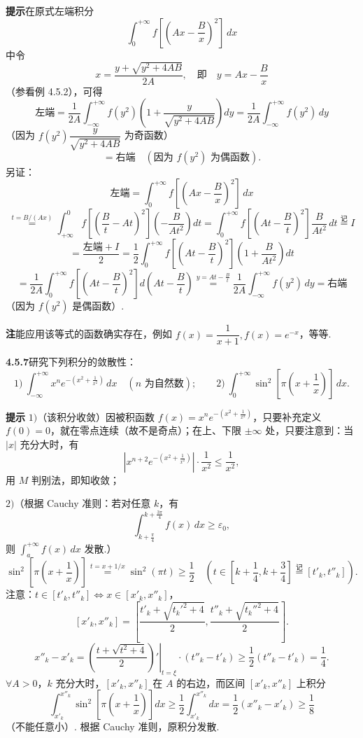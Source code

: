 \documentclass[UTF8, 12pt, fontset=fandol, oneside]{ctexart}
\begin{document}
\noindent\textbf{提示}\quad 在原式左端积分
\[
\int_0^{+\infty}f\left[\left(Ax-\frac Bx\right)^2\right]\,dx
\]
中令
\[
x=\frac{y+\sqrt{y^2+4AB}}{2A},
\quad\text{即}\quad y=Ax-\frac Bx
\]
（参看例 4.5.2），可得
\[
\text{左端}=\frac1{2A}\int_{-\infty}^{+\infty}f(y^2)\left(1+\frac y{\sqrt{y^2+4AB}}\right)dy
=\frac1{2A}\int_{-\infty}^{+\infty}f(y^2)\,dy
\]
（因为 $f(y^2)\dfrac y{\sqrt{y^2+4AB}}$ 为奇函数）
\[
=\text{右端}\quad(\text{因为 }f(y^2)\text{ 为偶函数}).
\]
另证：
\[
\text{左端}=\int_0^{+\infty}f\left[\left(Ax-\frac Bx\right)^2\right]\,dx
\]
\[
\stackrel{t=B/(Ax)}{=}\int_{+\infty}^0
f\left[\left(\frac Bt-At\right)^2\right]\left(-\frac B{At^2}\right)dt
=\int_0^{+\infty}f\left[\left(At-\frac Bt\right)^2\right]\frac B{At^2}\,dt\stackrel{\text{记}}{=}I
\]
\[
=\frac{\text{左端}+I}{2}
=\frac12\int_0^{+\infty}f\left[\left(At-\frac Bt\right)^2\right]\left(1+\frac B{At^2}\right)dt
\]
\[
=\frac1{2A}\int_0^{+\infty}f\left[\left(At-\frac Bt\right)^2\right]d\left(At-\frac Bt\right)
\stackrel{y=At-\frac Bt}{=}\frac1{2A}\int_{-\infty}^{+\infty}f(y^2)\,dy
=\text{右端}
\]
（因为 $f(y^2)$ 是偶函数）.

\noindent\textbf{注}\quad 能应用该等式的函数确实存在，例如 $f(x)=\dfrac1{x+1}, f(x)=e^{-x}$，等等.

\noindent\textbf{4.5.7}\quad 研究下列积分的敛散性：
\[
1)\ \int_{-\infty}^{+\infty}x^ne^{-\left(x^2+\frac1{x^2}\right)}\,dx\quad(n\text{ 为自然数});
\qquad
2)\ \int_0^{+\infty}\sin^2\left[\pi\left(x+\frac1x\right)\right]\,dx.
\]

\noindent\textbf{提示}\quad
$1)$（该积分收敛）因被积函数 $f(x)=x^ne^{-\left(x^2+\frac1{x^2}\right)}$，只要补充定义 $f(0)=0$，就在零点连续（故不是奇点）；在上、下限 $\pm\infty$ 处，只要注意到：当 $|x|$ 充分大时，有
\[
\left|x^{n+2}e^{-\left(x^2+\frac1{x^2}\right)}\right|\cdot\frac1{x^2}\le\frac1{x^2},
\]
用 $M$ 判别法，即知收敛；

$2)$（根据 Cauchy 准则：若对任意 $k$，有
\[
\int_{k+\frac\pi4}^{k+\frac{3\pi}4}f(x)\,dx\ge\varepsilon_0,
\]
则 $\displaystyle\int_a^{+\infty}f(x)\,dx$ 发散.）
\[
\sin^2\left[\pi\left(x+\frac1x\right)\right]\stackrel{t=x+1/x}{=}\sin^2(\pi t)\ge\frac12
\quad\left(t\in\left[k+\frac14,k+\frac34\right]\stackrel{\text{记}}{=}[t'_k,t''_k]\right).
\]
注意：$t\in[t'_k,t''_k]\Longleftrightarrow x\in[x'_k,x''_k]$，
\[
[x'_k,x''_k]=\left[\frac{t'_k+\sqrt{t_k'^2+4}}2,\frac{t''_k+\sqrt{t_k''^2+4}}2\right].
\]
\[
x''_k-x'_k
=\left.\left(\frac{t+\sqrt{t^2+4}}2\right)'\right|_{t=\xi}\cdot(t''_k-t'_k)
\ge\frac12(t''_k-t'_k)=\frac14.
\]
$\forall A>0$，$k$ 充分大时，$[x'_k,x''_k]$ 在 $A$ 的右边，而区间 $[x'_k,x''_k]$ 上积分
\[
\int_{x'_k}^{x''_k}\sin^2\left[\pi\left(x+\frac1x\right)\right]dx
\ge\frac12\int_{x'_k}^{x''_k}dx
=\frac12(x''_k-x'_k)\ge\frac18
\]
（不能任意小）. 根据 Cauchy 准则，原积分发散.
\end{document}
